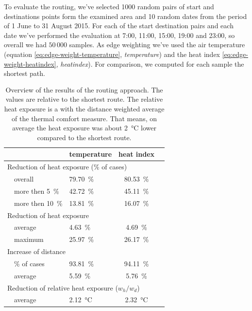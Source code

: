 To evaluate the routing, we've selected 1000 random pairs of start and destinations points form the examined  area and 10 random dates from the period of 1 June to 31 August 2015. For each of the start destination pairs and each date we've performed the evaluation at 7:00, 11:00, 15:00, 19:00 and 23:00, so overall we had $50\,000$ samples. As edge weighting we've used the air temperature (equation \eqref{eq:edge-weight-temperature}, \emph{temperature})  and the heat index \eqref{eq:edge-weight-heatindex}, \emph{heatindex}). For comparison, we computed for each sample the shortest path. 

\begin{table}
	\centering
	\begin{tabular}{lp{8cm}lcc}
		\hline
		 & & temperature & heat index \\
		 \hline
		 \multicolumn{4}{l}{Reduction of heat exposure (\% of cases) }   \\
		& overall  & \SI{79.70}{\percent} & \SI{80.53}{\percent}  \\
		& more then \SI{5}{\percent} & \SI{42.72}{\percent} & \SI{45.11}{\percent} \\
		& more then \SI{10}{\percent} & \SI{13.81}{\percent} & \SI{16.07}{\percent} \\
		 \multicolumn{4}{l}{Reduction of heat exposure}  \\
		& average  & \SI{4.63}{\percent} & \SI{4.69}{\percent}  \\
		& maximum  & \SI{25.97}{\percent} & \SI{26.17 }{\percent}  \\
		\multicolumn{4}{l}{Increase of distance}  \\
		& \% of cases & \SI{93.81}{\percent} & \SI{94.11}{\percent}  \\
		& average & \SI{5.59}{\percent} & \SI{5.76}{\percent}  \\
		 \multicolumn{4}{l}{Reduction of relative heat exposure ($w_h / w_d$)}  \\
		 & average  & \SI{2.12}{\celsius} & \SI{2.32}{\celsius}  \\
		 \hline
	\end{tabular}
	\caption{Overview of the results of the routing approach. The values are relative to the shortest route. The relative heat exposure is a with the distance weighted average of the thermal comfort measure. That means, on average the heat exposure was about \SI{2}{\celsius} lower compared to the shortest route. \label{tab:results-routing}}
\end{table}

